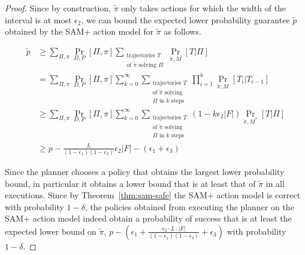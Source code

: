 \documentclass[letterpaper]{article} %
\begin{document}
\begin{proof}
Since by construction, $\tilde{\pi}$ only takes actions for which the width of the interval is at most $\epsilon_2$, we can bound the expected lower probability guarantee $\tilde{p}$ obtained by the SAM+ action model for $\tilde{\pi}$ as follows.
\begin{small}
\begin{align*}
\tilde{p} &\geq \sum_{\Pi,\pi}\Pr_{D,P}[\Pi,\pi]\sum_{\substack{\text{trajectories }T\\\text{of }\tilde{\pi}\text{ solving }\Pi}}\Pr_{\tilde{\pi},M}[T|\Pi]\\
&=\sum_{\Pi,\pi}\Pr_{D,P}[\Pi,\pi]\sum_{k=0}^\infty\sum_{\substack{\text{trajectories }T\\\text{of }\tilde{\pi}\text{ solving}\\
\Pi\text{ in }k\text{ steps}}}\prod_{i=1}^k\Pr_{\tilde{\pi},M}[T_i|T_{i-1}]\\
&\geq \sum_{\Pi,\pi}\Pr_{D,P}[\Pi,\pi]\sum_{k=0}^\infty\sum_{\substack{\text{trajectories }T\\\text{of }\tilde{\pi}\text{ solving}\\
\Pi\text{ in }k\text{ steps}}}(1-k\epsilon_2|F|)\Pr_{\tilde{\pi},M^*}[T|\Pi]\\
&\geq p-\frac{L}{(1-\epsilon_1)(1-\epsilon_3)}\epsilon_2|F|-(\epsilon_1+\epsilon_3)
\end{align*}
\end{small}

Since the planner chooses a policy that obtains the largest lower probability bound, in particular it obtains a lower bound that is at least that of $\tilde{\pi}$ in all executions. Since by Theorem~\ref{thm:sam-safe} the SAM+ action model is correct with probability $1-\delta$, the policies obtained from executing the planner on the SAM+ action model indeed obtain a probability of success that is at least the expected lower bound on $\tilde{\pi}$, $p-(\epsilon_1+\frac{\epsilon_2\cdot L\cdot |F|}{(1-\epsilon_1)(1-\epsilon_3)}+\epsilon_3)$ with probability $1-\delta$.
\end{proof}
\end{document}
